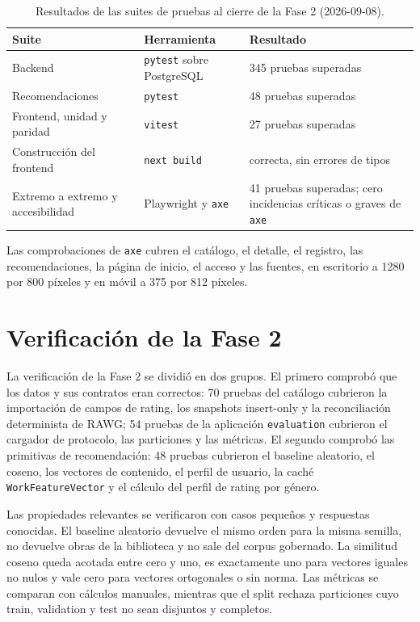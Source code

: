 \begin{table}[htp]
\centering
\begin{tabularx}{\textwidth}{ | Y | Y | Y | }
    \hline
    \textbf{Suite} & \textbf{Herramienta} & \textbf{Resultado} \\
    \hline
    Backend & \texttt{pytest} sobre PostgreSQL & 345 pruebas superadas \\
    \hline
    Recomendaciones & \texttt{pytest} & 48 pruebas superadas \\
    \hline
    Frontend, unidad y paridad & \texttt{vitest} & 27 pruebas superadas \\
    \hline
    Construcción del frontend & \texttt{next build} & correcta, sin errores de tipos \\
    \hline
    Extremo a extremo y accesibilidad & Playwright y \texttt{axe} & 41 pruebas superadas; cero incidencias críticas o graves de \texttt{axe} \\
    \hline
\end{tabularx}
\caption{Resultados de las suites de pruebas al cierre de la Fase 2 (2026-09-08).}
\label{tab:suites}
\end{table}

Las comprobaciones de \texttt{axe} cubren el catálogo, el detalle, el registro, las
recomendaciones, la página de inicio, el acceso y las fuentes, en escritorio a 1280 por 800
píxeles y en móvil a 375 por 812 píxeles.

\section{Verificación de la Fase 2}\label{sec:pru-fase2}

La verificación de la Fase 2 se dividió en dos grupos. El primero comprobó que los datos y
sus contratos eran correctos: 70 pruebas del catálogo cubrieron la importación de campos de
rating, los snapshots insert-only y la reconciliación determinista de RAWG; 54 pruebas de
la aplicación \texttt{evaluation} cubrieron el cargador de protocolo, las particiones y las
métricas. El segundo comprobó las primitivas de recomendación: 48 pruebas cubrieron el
baseline aleatorio, el coseno, los vectores de contenido, el perfil de usuario, la caché
\texttt{WorkFeatureVector} y el cálculo del perfil de rating por género.

Las propiedades relevantes se verificaron con casos pequeños y respuestas conocidas. El
baseline aleatorio devuelve el mismo orden para la misma semilla, no devuelve obras de la
biblioteca y no sale del corpus gobernado. La similitud coseno queda acotada entre cero y
uno, es exactamente uno para vectores iguales no nulos y vale cero para vectores ortogonales
o sin norma. Las métricas se comparan con cálculos manuales, mientras que el split rechaza
particiones cuyo train, validation y test no sean disjuntos y completos.

